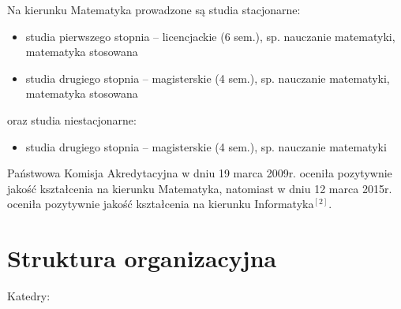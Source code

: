 \documentclass[a4paper,12pt]{article}
\begin{document}
Na kierunku Matematyka prowadzone są studia stacjonarne:

\begin{itemize}
\item studia pierwszego stopnia – licencjackie (6 sem.), sp. nauczanie matematyki, matematyka stosowana
\item studia drugiego stopnia – magisterskie (4 sem.), sp. nauczanie matematyki, matematyka stosowana
\end{itemize}

oraz studia niestacjonarne:

\begin{itemize}
\item studia drugiego stopnia – magisterskie (4 sem.), sp. nauczanie matematyki
\end{itemize}

\newline{}Państwowa Komisja Akredytacyjna w dniu 19 marca 2009r. oceniła pozytywnie jakość kształcenia na kierunku Matematyka, natomiast w dniu 12 marca 2015r. oceniła pozytywnie jakość kształcenia na kierunku Informatyka$^{[2]}$.

\section{Struktura organizacyjna}
Katedry:
\end{document}
